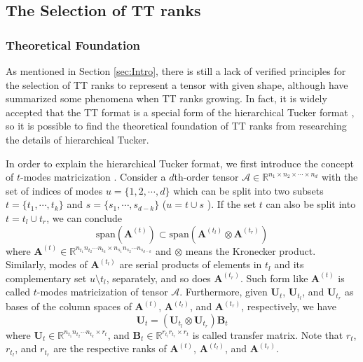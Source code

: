 \documentclass[a4paper,fleqn]{cas-dc}
\begin{document}
\subsection{The Selection of TT ranks}

\subsubsection{Theoretical Foundation}\quad

As mentioned in Section \ref{sec:Intro}, there is still a lack of verified principles for the selection of TT ranks to represent a tensor with given shape, although \citet{Novikov_2015_TT} have summarized some phenomena when TT ranks growing. In fact, it is widely accepted that the TT format is a special form of the hierarchical Tucker format \citep{Grasedyck_2010_InventHT,Lee_2016_HTTT,Grasedyck_2011_HTTT,Khrulkov_2018_TTRNN}, so it is possible to find the theoretical foundation of TT ranks from researching the details of hierarchical Tucker.

In order to explain the hierarchical Tucker format, we first introduce the concept of \(t\)-modes matricization \citep{Grasedyck_2010_InventHT}. Consider a \( d \)th-order tensor \( \bm{ \mathcal{A} } \in \mathbb{R} ^{n_{1} \times n_{2} \times \cdots \times n_{d}} \) with the set of indices of modes \( u=\{1,2,\cdots,d\} \) which can be split into two subsets \( t=\{t_{1},\cdots,t_{k}\} \) and \( s=\{s_{1},\cdots,s_{d-k}\} \) (\(u=t \cup s\) ). If the set \( t \)  can also be split into \( t=t_{l} \cup t_{r} \), we can conclude \citep{Kressner_2011_HT}
\begin{equation*}
\mathrm{span}(\bm{A} ^{(t)}) \subset \mathrm{span}(\bm{A} ^{(t_{l})} \otimes \bm{A} ^{(t_{r})})
\end{equation*}
where \( \bm{A} ^{(t)} \in \mathbb{R} ^{n_{t_{1}}n_{t_{2}} \cdots n_{t_{k}} \times n_{s_{1}}n_{s_{2}} \cdots n_{s_{d-k}}} \) and \( \otimes \) means the Kronecker product. Similarly, modes of \( \bm{A} ^{(t_{l})} \) are serial products of elements in \( t_{l} \) and its complementary set \( u \setminus t_{l} \), separately, and so does \( \bm{A} ^{(t_{r})} \). Such form like \( \bm{A} ^{(t)} \) is called \( t \)-modes matricization of tensor \( \bm{ \mathcal{A} } \). Furthermore, given \( \bm{U} _{t} \), \( \bm{U} _{t_{l}} \), and \( \bm{U} _{t_{r}} \) as bases of the column spaces of \( \bm{A} ^{(t)} \), \( \bm{A} ^{(t_{l})} \), and \( \bm{A} ^{(t_{r})} \), respectively, we have
\begin{equation}\label{Eq_HT_Basis}
\bm{U} _{t} = (\bm{U} _{t_{l}} \otimes \bm{U} _{t_{r}})\bm{B} _{t}
\end{equation}
where \( \bm{U} _{t} \in \mathbb{R} ^{n_{t_{1}}n_{t_{2}} \cdots n_{t_{k}} \times r_{t}} \), and \( \bm{B} _{t} \in \mathbb{R} ^{r_{t_{l}}r_{t_{r}} \times r_{t}} \) is called transfer matrix. Note that \( r_{t} \), \( r_{t_{l}} \), and \( r_{t_{r}} \) are the respective ranks of \( \bm{A} ^{(t)} \), \( \bm{A} ^{(t_{l})} \), and \( \bm{A} ^{(t_{r})} \).
\end{document}
